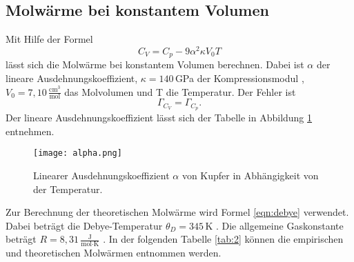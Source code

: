 

\subsection{Molwärme bei konstantem Volumen}
Mit Hilfe der Formel
\begin{equation}
  C_V = C_p - 9\alpha^2\kappa{V_0}T
\end{equation}
lässt sich die Molwärme bei konstantem Volumen berechnen.
Dabei ist $\alpha$ der lineare Ausdehnungskoeffizient, $\kappa = 140$\,GPa der Kompressionsmodul \cite{kappa}, $V_0 = 7,10 \,\frac{\text{cm}^3}{\text{mol}}$ das Molvolumen \cite{cu} und T die Temperatur.
Der Fehler ist
\begin{equation}
  \Gamma_{C_V} = \Gamma_{C_p}.
\end{equation}
Der lineare Ausdehnungskoeffizient lässt sich der Tabelle in Abbildung \ref{alpha} entnehmen.

\begin{figure}[H]
  \centering
  \texttt{[image: alpha.png]}
  \caption{Linearer Ausdehnungskoeffizient $\alpha$ von Kupfer in Abhängigkeit von der Temperatur. \cite{skript}}
  \label{alpha}
\end{figure}

Zur Berechnung der theoretischen Molwärme wird Formel \eqref{eqn:debye} verwendet.
Dabei beträgt die Debye-Temperatur $\theta_D = 345$\,K \cite{debye}.
Die allgemeine Gaskonstante beträgt $R = 8,31 \,\frac{\text{J}}{\text{mol}\cdot\text{K}}$ \cite[587]{dem}.
In der folgenden Tabelle \ref{tab:2} können die empirischen und theoretischen Molwärmen entnommen werden.

